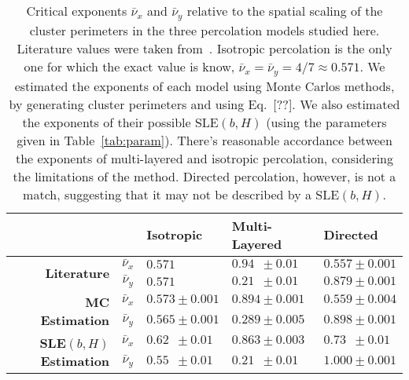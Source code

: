 \begin{table}
\begin{centering}
\begin{tabular}{rclll}
\bottomrule[0.1mm]
\toprule[0.1mm]
                                                                    &                 & \textbf{Isotropic}  & \textbf{Multi-Layered} & \textbf{Directed}   \\
\toprule[0.1mm]
\multirow{2}{*}{\textbf{Literature}}                                & $\bar{\nu}_{x}$ & $0.571$             & $0.94\,\,\,\pm0.01$    & $0.557\pm0.001$     \\[0.1cm]
                                                                    & $\bar{\nu}_{y}$ & $0.571$             & $0.21\,\,\,\pm0.01$    & $0.879\pm0.001$     \\[0.1cm]
\toprule[0.1mm]
\multirow{2}{*}{\textbf{MC Estimation}}                             & $\bar{\nu}_{x}$ & $0.573\pm0.001$     & $0.894\pm0.001$        & $0.559\pm0.004$     \\[0.1cm]
                                                                    & $\bar{\nu}_{y}$ & $0.565\pm0.001$     & $0.289\pm0.005$        & $0.898\pm0.001$     \\[0.1cm]
\toprule[0.1mm]
\multirow{2}{*}{\textbf{SLE}$\left(b,H\right)$ \textbf{Estimation}} & $\bar{\nu}_{x}$ & $0.62\,\,\,\pm0.01$ & $0.863\pm0.003$        & $0.73\,\,\,\pm0.01$ \\[0.1cm]
                                                                    & $\bar{\nu}_{y}$ & $0.55\,\,\,\pm0.01$ & $0.21\,\,\,\pm0.01$    & $1.000\pm0.001$     \\[0.1cm]
\bottomrule[0.1mm]
\toprule[0.1mm]
\end{tabular}
\par\end{centering}
\caption{Critical exponents $\bar{\nu}_x$ and $\bar{\nu}_y$ relative to the
    spatial scaling of the cluster perimeters in the three percolation models
    studied here. Literature values were taken from~\cite{Ziff1986, Dayan1991,
    Owczarek1997}. Isotropic percolation is the only one for which the
    exact value is know, $\bar{\nu}_x= \bar{\nu}_y= 4/7\approx0.571$. We
    estimated the exponents of each model using Monte Carlos methods, by
    generating cluster perimeters and using Eq.~[??]. We also estimated the
    exponents of their possible SLE$(b,H)$ (using the parameters given in
    Table~\ref{tab:param}). There's reasonable accordance between the exponents
    of multi-layered and isotropic percolation, considering the limitations of
    the method. Directed percolation, however, is not a match, suggesting that
    it may not be described by a SLE$(b,H)$.}
\label{tab:nus}
\end{table}
